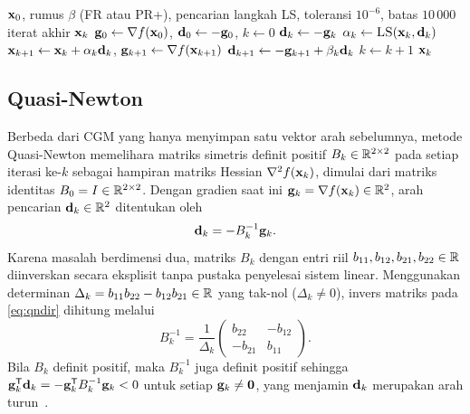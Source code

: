 \documentclass[12pt,a4paper]{article}
\begin{document}
\begin{algorithm}[H]
\caption{CGM nonlinear dengan restart.}\label{alg:cgm}
\begin{algorithmic}[1]
\Require $\mathbf{x}_0$, rumus $\beta$ (FR atau PR+), pencarian langkah \textsc{LS}, toleransi $10^{-6}$, batas $10\,000$
\Ensure iterat akhir $\mathbf{x}_k$
\State $\mathbf{g}_0\gets\nabla f(\mathbf{x}_0)$, $\mathbf{d}_0\gets-\mathbf{g}_0$, $k\gets0$
   $\mathbf{d}_k\gets-\mathbf{g}_k$  \EndIf
  \State $\alpha_k\gets\textsc{LS}(\mathbf{x}_k,\mathbf{d}_k)$
  \State $\mathbf{x}_{k+1}\gets\mathbf{x}_k+\alpha_k\mathbf{d}_k$, $\mathbf{g}_{k+1}\gets\nabla f(\mathbf{x}_{k+1})$
  \State $\mathbf{d}_{k+1}\gets-\mathbf{g}_{k+1}+\beta_k\mathbf{d}_k$ 
  \State $k\gets k+1$
\EndWhile
\State \Return $\mathbf{x}_k$
\end{algorithmic}
\end{algorithm}

\subsection{Quasi-Newton}\label{sec:qn}
Berbeda dari CGM yang hanya menyimpan satu vektor arah sebelumnya, metode Quasi-Newton memelihara matriks simetris
definit positif $B_k\in\mathbb{R}^{2\times2}$ pada setiap iterasi ke-$k$ sebagai hampiran matriks Hessian
$\nabla^2 f(\mathbf{x}_k)$, dimulai dari matriks identitas $B_0=I\in\mathbb{R}^{2\times2}$. Dengan gradien saat ini
$\mathbf{g}_k=\nabla f(\mathbf{x}_k)\in\mathbb{R}^2$, arah pencarian $\mathbf{d}_k\in\mathbb{R}^2$ ditentukan oleh
\begin{equation}\label{eq:qndir}
\mathbf{d}_k=-B_k^{-1}\mathbf{g}_k.
\end{equation}
Karena masalah berdimensi dua, matriks $B_k$ dengan entri riil $b_{11},b_{12},b_{21},b_{22}\in\mathbb{R}$ diinverskan secara
eksplisit tanpa pustaka penyelesai sistem linear. Menggunakan determinan $\Delta_k=b_{11}b_{22}-b_{12}b_{21}\in\mathbb{R}$
yang tak-nol ($\Delta_k\neq0$), invers matriks pada \eqref{eq:qndir} dihitung melalui
\begin{equation}\label{eq:inv2x2}
B_k^{-1}=\frac{1}{\Delta_k}\begin{pmatrix}b_{22} & -b_{12}\\ -b_{21} & b_{11}\end{pmatrix}.
\end{equation}
Bila $B_k$ definit positif, maka $B_k^{-1}$ juga definit positif sehingga $\mathbf{g}_k^{\mathsf{T}}\mathbf{d}_k=-\mathbf{g}_k^{\mathsf{T}} B_k^{-1}\mathbf{g}_k<0$
untuk setiap $\mathbf{g}_k\neq\mathbf{0}$, yang menjamin $\mathbf{d}_k$ merupakan arah turun~\cite{nocedal}.
\end{document}
